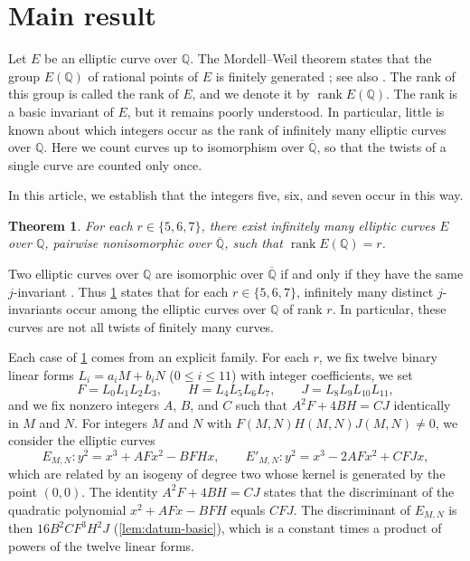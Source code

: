 \documentclass[12pt,oneside,openany]{book}
\theoremstyle{definition}
\theoremstyle{plain}
\numberwithin{equation}{chapter}
\theoremstyle{plain}
\newtheorem{theorem}{Theorem}[chapter]
\theoremstyle{definition}
\theoremstyle{remark}
\newcommand{\Q}{\mathbb Q}
\newcommand{\Qbar}{\overline{\mathbb Q}}
\DeclareMathOperator{\rk}{rank}
\begin{document}
\section{Main result}\label{sec:intro-main}

Let $E$ be an elliptic curve over $\Q$. The Mordell--Weil theorem states that the group $E(\Q)$ of rational points of $E$ is finitely generated \cite{Mordell1922,Weil1929}; see also \cite[Theorem~VIII.6.7]{SilvermanAEC}. The rank of this group is called the rank of $E$, and we denote it by $\rk E(\Q)$. The rank is a basic invariant of $E$, but it remains poorly understood. In particular, little is known about which integers occur as the rank of infinitely many elliptic curves over $\Q$. Here we count curves up to isomorphism over $\Qbar$, so that the twists of a single curve are counted only once.

In this article, we establish that the integers five, six, and seven occur in this way.

\begin{theorem}\label{thm:main}
For each $r\in\{5,6,7\}$, there exist infinitely many elliptic curves $E$ over $\Q$, pairwise nonisomorphic over $\Qbar$, such that $\rk E(\Q)=r$.
\end{theorem}

Two elliptic curves over $\Q$ are isomorphic over $\Qbar$ if and only if they have the same $j$-invariant \cite[Proposition~III.1.4(b)]{SilvermanAEC}. Thus \cref{thm:main} states that for each $r\in\{5,6,7\}$, infinitely many distinct $j$-invariants occur among the elliptic curves over $\Q$ of rank $r$. In particular, these curves are not all twists of finitely many curves.

Each case of \cref{thm:main} comes from an explicit family. For each $r$, we fix twelve binary linear forms $L_i=a_iM+b_iN$ ($0\le i\le 11$) with integer coefficients, we set
\begin{equation*}
F=L_0L_1L_2L_3,\qquad H=L_4L_5L_6L_7,\qquad J=L_8L_9L_{10}L_{11},
\end{equation*}
and we fix nonzero integers $A$, $B$, and $C$ such that $A^2F+4BH=CJ$ identically in $M$ and $N$. For integers $M$ and $N$ with $F(M,N)H(M,N)J(M,N)\ne0$, we consider the elliptic curves
\begin{equation}\label{eq:intro-curves}
E_{M,N}\colon y^2=x^3+AFx^2-BFHx,\qquad E'_{M,N}\colon y^2=x^3-2AFx^2+CFJx,
\end{equation}
which are related by an isogeny of degree two whose kernel is generated by the point $(0,0)$. The identity $A^2F+4BH=CJ$ states that the discriminant of the quadratic polynomial $x^2+AFx-BFH$ equals $CFJ$. The discriminant of $E_{M,N}$ is then $16B^2CF^3H^2J$ (\cref{lem:datum-basic}), which is a constant times a product of powers of the twelve linear forms.
\end{document}
